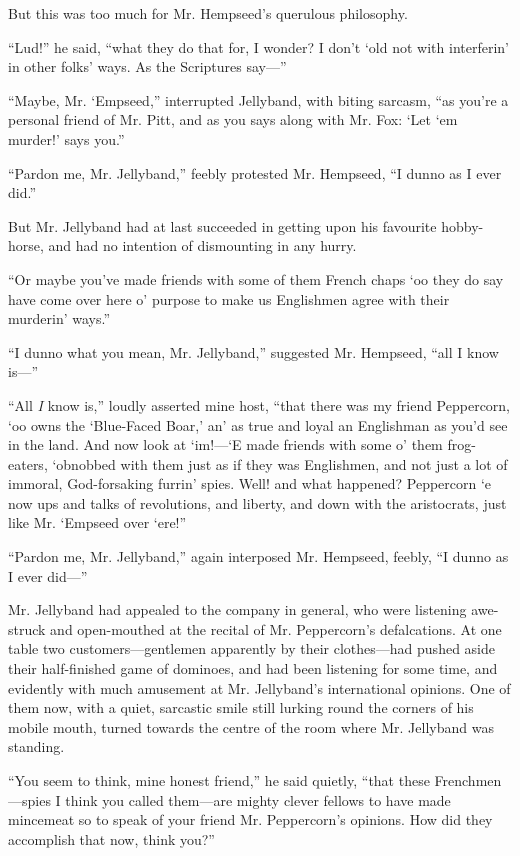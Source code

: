 \documentclass[paper=5.5in:8.5in,BCOR=7mm,twoside,DIV=calc,12pt,usegeometry,chapterprefix,endperiod,headings=big]{scrbook}
\begin{document}
But this was too much for Mr. Hempseed's querulous philosophy.

\enquote{Lud!} he said, \enquote{what they do that for, I wonder? I don't `old not with interferin’ in other folks’ ways. As the Scriptures say---}

\enquote{Maybe, Mr. `Empseed,} interrupted Jellyband, with biting sarcasm, \enquote{as you're a personal friend of Mr. Pitt, and as you says along with Mr. Fox: \enquote{Let `em murder!} says you.}

\enquote{Pardon me, Mr. Jellyband,} feebly protested Mr. Hempseed, \enquote{I dunno as I ever did.}

But Mr. Jellyband had at last succeeded in getting upon his favourite hobby-horse, and had no intention of dismounting in any hurry.

\enquote{Or maybe you've made friends with some of them French chaps `oo they do say have come over here o’ purpose to make us Englishmen agree with their murderin’ ways.}

\enquote{I dunno what you mean, Mr. Jellyband,} suggested Mr. Hempseed, \enquote{all I know is---}

\enquote{All \textit{I} know is,} loudly asserted mine host, \enquote{that there was my friend Peppercorn, `oo owns the \enquote{Blue-Faced Boar,} an’ as true and loyal an Englishman as you'd see in the land. And now look at `im!---`E made friends with some o’ them frog-eaters, `obnobbed with them just as if they was Englishmen, and not just a lot of immoral, God-forsaking furrin’ spies. Well! and what happened? Peppercorn `e now ups and talks of revolutions, and liberty, and down with the aristocrats, just like Mr. `Empseed over `ere!}

\enquote{Pardon me, Mr. Jellyband,} again interposed Mr. Hempseed, feebly, \enquote{I dunno as I ever did---}

Mr. Jellyband had appealed to the company in general, who were listening awe-struck and open-mouthed at the recital of Mr. Peppercorn's defalcations. At one table two customers---gentlemen apparently by their clothes---had pushed aside their half-finished game of dominoes, and had been listening for some time, and evidently with much amusement at Mr. Jellyband's international opinions. One of them now, with a quiet, sarcastic smile still lurking round the corners of his mobile mouth, turned towards the centre of the room where Mr. Jellyband was standing.

\enquote{You seem to think, mine honest friend,} he said quietly, \enquote{that these Frenchmen---spies I think you called them---are mighty clever fellows to have made mincemeat so to speak of your friend Mr. Peppercorn's opinions. How did they accomplish that now, think you?}
\end{document}

